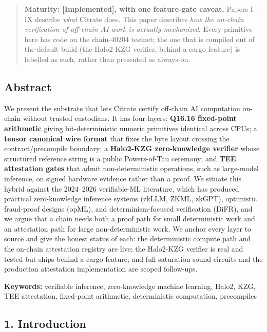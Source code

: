 \begin{quote}
\textbf{Maturity: {[}Implemented{]}, with one feature-gate caveat.}
Papers I--IX describe \emph{what} Citrate does. This paper describes
\emph{how the on-chain verification of off-chain AI work is actually
mechanized}. Every primitive here has code on the chain-40204 testnet;
the one that is compiled out of the default build (the Halo2-KZG
verifier, behind a cargo feature) is labelled as such, rather than
presented as always-on.
\end{quote}

\subsection{Abstract}\label{abstract}

We present the substrate that lets Citrate certify off-chain AI
computation on-chain without trusted custodians. It has four layers:
\textbf{Q16.16 fixed-point arithmetic} giving bit-deterministic numeric
primitives identical across CPUs; a \textbf{tensor canonical wire
format} that fixes the byte layout crossing the contract/precompile
boundary; a \textbf{Halo2-KZG zero-knowledge verifier} whose structured
reference string is a public Powers-of-Tau ceremony; and \textbf{TEE
attestation gates} that admit non-deterministic operations, such as
large-model inference, on signed hardware evidence rather than a proof.
We situate this hybrid against the 2024--2026 verifiable-ML literature,
which has produced practical zero-knowledge inference systems (zkLLM,
ZKML, zkGPT), optimistic fraud-proof designs (opML), and
determinism-focused verification (DiFR), and we argue that a chain needs
both a proof path for small deterministic work and an attestation path
for large non-deterministic work. We anchor every layer to source and
give the honest status of each: the deterministic compute path and the
on-chain attestation registry are live; the Halo2-KZG verifier is real
and tested but ships behind a cargo feature; and full saturation-sound
circuits and the production attestation implementation are scoped
follow-ups.

\textbf{Keywords:} verifiable inference, zero-knowledge machine
learning, Halo2, KZG, TEE attestation, fixed-point arithmetic,
deterministic computation, precompiles

\subsection{1. Introduction}\label{introduction}

